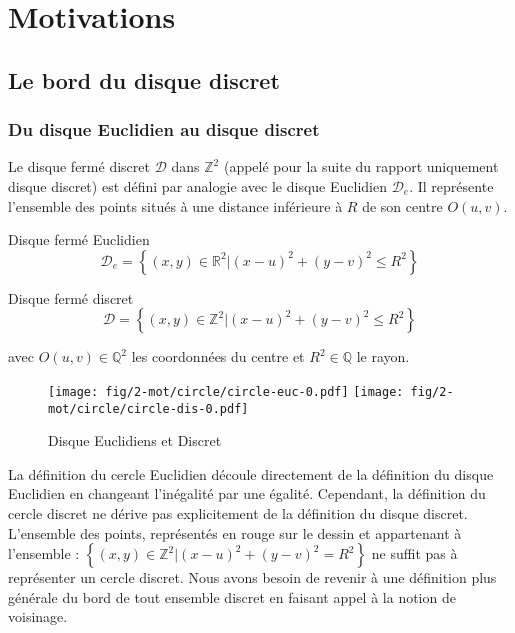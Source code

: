 \section{Motivations}

\subsection{Le bord du disque discret}

\subsubsection{Du disque Euclidien au disque discret}


Le  disque fermé discret $\mathcal{D}$ dans $\mathbb{Z}^{2}$ (appelé pour la suite du rapport uniquement disque discret) est défini par analogie avec le disque Euclidien $\mathcal{D}_e$. Il représente l'ensemble des points situés à une distance inférieure à $R$ de son centre $O(u,v)$.


\begin{Definition}{Disque fermé Euclidien}
\label{def:disk-euc}
 $$\mathcal{D}_e =  \left\{ (x,y) \in \mathbb{R}^{2} |  (x - u)^2 + (y - v)^2 \leq R^2 \right\}$$
\end{Definition}

\begin{Definition}{Disque fermé discret}
\label{def:disk-dis}
  $$\mathcal{D} =  \left\{ (x,y) \in \mathbb{Z}^{2} |  (x - u)^2 + (y - v)^2 \leq R^2 \right\}$$
  
  avec $O(u,v) \in \mathbb{Q}^{2}$ les coordonnées du centre et $R^2 \in \mathbb{Q}$ le rayon.\\
\end{Definition}

\begin{figure}[H]
  \centering
  \texttt{[image: fig/2-mot/circle/circle-euc-0.pdf]}
  \texttt{[image: fig/2-mot/circle/circle-dis-0.pdf]}
  \caption{Disque Euclidiens et Discret}
\end{figure}

La définition du cercle Euclidien découle directement de la définition du disque Euclidien en changeant l'inégalité par une égalité. Cependant, la définition du cercle discret ne dérive pas explicitement de la définition du disque discret. L'ensemble des points, représentés en rouge sur le dessin et appartenant à l'ensemble : $\left\{ (x,y) \in \mathbb{Z}^{2} |  (x - u)^2 + (y - v)^2 = R^2 \right\}$ ne suffit pas à représenter un cercle discret. Nous avons besoin de revenir à une définition plus générale du bord de tout ensemble discret en faisant appel à la notion de voisinage.\\

